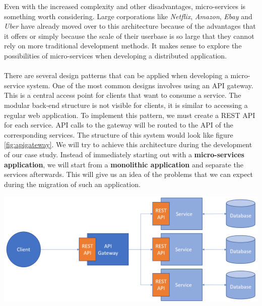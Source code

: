 \documentclass[12pt]{article}
\newenvironment{Figure}
	{\par\medskip\noindent\minipage{\linewidth}}
	{\endminipage\par\medskip}
\begin{document}
\begin{multicols}{2}
Even with the increased complexity and other disadvantages, micro-services is something worth considering. Large corporations like \textit{Netflix}, \textit{Amazon}, \textit{Ebay} and \textit{Uber} have already moved over to this architecture because of the advantages that it offers or simply because the scale of their userbase is so large that they cannot rely on more traditional development methods. It makes sense to explore the possibilities of micro-services when developing a distributed application.
\\\\
There are several design patterns that can be applied when developing a micro-service system. \cite{MicroservicePatterns25:online} One of the most common designs involves using an API gateway. This is a central access point for clients that want to consume a service. The modular back-end structure is not visible for clients, it is similar to accessing a regular web application. To implement this pattern, we must create a REST API for each service. API calls to the gateway will be routed to the API of the corresponding services. The structure of this system would look like figure \ref{fig:apigateway}. We will try to achieve this architecture during the development of our case study. Instead of immediately starting out with a \textbf{micro-services application}, we will start from a \textbf{monolithic application} and separate the services afterwards. This will give us an idea of the problems that we can expect during the migration of such an application. 

\begin{Figure}
	\centering
	\includegraphics[width=\linewidth]{illustrations/ApiGateway.png}
	\label{fig:apigateway}
\end{Figure}

\end{multicols}
\end{document}
